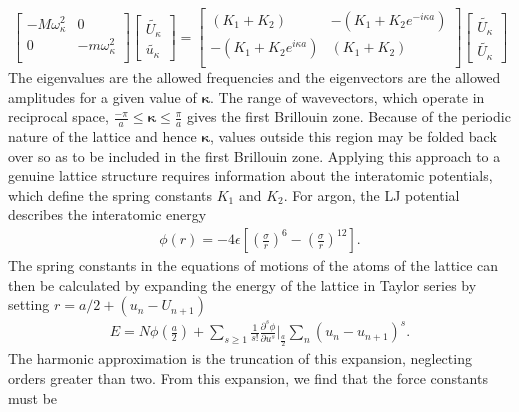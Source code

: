 %
\begin{equation}
\begin{bmatrix}
  -M\omega_\kappa^2 & 0\\
  0 & -m\omega_\kappa^2\\ 
 \end{bmatrix}
\begin{bmatrix}
\tilde{U_\kappa} \\ 
\tilde{u_\kappa}
\end{bmatrix}
=
\begin{bmatrix}
  (K_1+K_2) & -(K_1+K_2e^{-i\kappa a})\\
  -(K_1+K_2e^{i\kappa a}) & (K_1+K_2) \\ 
 \end{bmatrix}
\begin{bmatrix}
\tilde{U_\kappa} \\ \tilde{U_\kappa}
\end{bmatrix}
\end{equation}
%
The eigenvalues are the allowed frequencies and the eigenvectors are the allowed amplitudes for a given value of $\pmb{\kappa}$. The range of wavevectors, which operate in reciprocal space,  $\frac{-\pi}{a}\leq \pmb{\kappa}\leq\frac{\pi}{a}$ gives the first Brillouin zone. Because of the periodic nature of the lattice and hence $\pmb{\kappa}$, values outside this region may be folded back over so as to be included in the first Brillouin zone.
Applying this approach to a genuine lattice structure requires information about the interatomic potentials, which define the spring constants $K_1$ and $K_2$. For argon, the LJ potential describes the interatomic energy
\begin{align}
	\phi(r)=-4\epsilon\left[\left(\frac{\sigma}{r}\right)^6-\left(\frac{\sigma}{r}\right)^{12}\right].
\end{align}
The spring constants in the equations of motions of the atoms of the lattice can then be calculated by expanding the energy of the lattice in Taylor series by setting $r=a/2+(u_n-U_{n+1})$
%
\begin{equation}\label{EQ:eng_exp}
\begin{split}
	E=N\phi \left(\frac{a}{2}\right)+\sum_{s\geq1}\frac{1}{s!}\frac{\partial^s\phi}{\partial u^s} \bigg|_{\frac{a}{2}} \sum_n(u_n-u_{n+1})^s.
\end{split}
\end{equation}
%
The harmonic approximation is the truncation of this expansion, neglecting orders greater than two. From this expansion, we find that the force constants must be
